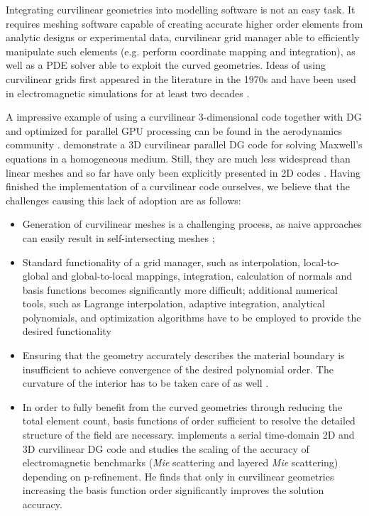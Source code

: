 
\noindent
Integrating curvilinear geometries into modelling software is not an easy task. It requires meshing software capable of creating accurate higher order elements from analytic designs or experimental data, curvilinear grid manager able to efficiently manipulate such elements (e.g. perform coordinate mapping and integration), as well as a PDE solver able to exploit the curved geometries. Ideas of using curvilinear grids first appeared in the literature in the 1970s \citep{ciarlet+1972, lenoir1986} and have been used in electromagnetic simulations for at least two decades \citep{wang+1993}. 

\noindent
A impressive example of using a curvilinear $3$-dimensional code together with DG and optimized for parallel GPU processing can be found in the aerodynamics community \citep{Warburton2012}.
\citeauthor{wang+2011}\citep{wang+2011} demonstrate a 3D curvilinear parallel DG code for solving Maxwell's equations in a homogeneous medium.
Still, they are much less widespread than linear meshes and so far have only been explicitly presented in 2D codes \citep{wang+2011a}.
Having finished the implementation of a curvilinear code ourselves, we believe that the challenges causing this lack of adoption are as follows:
\begin{itemize}
\item Generation of curvilinear meshes is a challenging process, as naive approaches can easily result in self-intersecting meshes \citep{toulorge+2013, johnen+2012};
\item Standard functionality of a grid manager, such as interpolation, local-to-global and global-to-local mappings, integration, calculation of normals and basis functions becomes significantly more difficult; additional numerical tools, such as Lagrange interpolation, adaptive integration, analytical polynomials, and optimization algorithms have to be employed to provide the desired functionality
\item Ensuring that the geometry accurately describes the material boundary is insufficient to achieve convergence of the desired polynomial order. The curvature of the interior has to be taken care of as well \cite{lenoir1986}.
\item In order to fully benefit from the curved geometries through reducing the total element count, basis functions of order sufficient to resolve the detailed structure of the field are necessary. \citeauthor{fahs2011}\citep{fahs2011} implements a serial time-domain 2D and 3D curvilinear DG code and studies the scaling of the accuracy of electromagnetic benchmarks (\textit{Mie} scattering and layered \textit{Mie} scattering) depending on p-refinement. He finds that only in curvilinear geometries increasing the basis function order significantly improves the solution accuracy.
\end{itemize}

